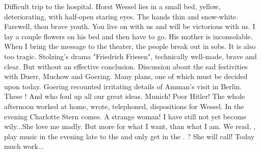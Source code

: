 Difficult trip to the hospital. Horst Wessel lies in a small bed, yellow, deteriorating, with half-open staring eyes. The hands thin and snow-white. Farewell, thou brave youth. You live on with us and will be victorious with us. I lay a couple flowers on his bed and then have to go. His mother is inconsolable. When I bring the message to the theater, the people break out in sobs. It is also too tragic. Stolzing's drama "Friedrich Friesen", technically well-made, brave and clear. But without an effective conclusion. Discussion about the sad festivities with Duerr, Muchow and Goering. Many plans, one of which must be decided upon today. Goering recounted irritating details of Amman's visit in Berlin. These ! And who foul up all our great ideas. Munich! Poor Hitler! The whole afternoon worked at home, wrote, telephoned, dispositions for Wessel. In the evening Charlotte Stern comes. A strange woman! I have still not yet become wily...She love me madly. But more for what I want, than what I am. We read, \missing, play music \missing in the evening late to the \missing and only get in the \missing. \missing? She will call! Today much work...

